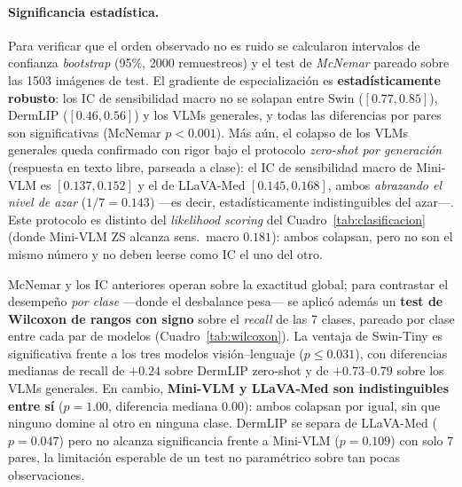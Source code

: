 \documentclass[11pt, a4paper]{article}
\begin{document}
\paragraph{Significancia estadística.} Para verificar que el orden observado no es ruido se calcularon
intervalos de confianza \emph{bootstrap} (95\%, 2000 remuestreos) y el test de \emph{McNemar} pareado
sobre las 1503 imágenes de test. El gradiente de especialización es \textbf{estadísticamente robusto}:
los IC de sensibilidad macro no se solapan entre Swin ($[0.77,0.85]$), DermLIP ($[0.46,0.56]$) y los VLMs
generales, y todas las diferencias por pares son significativas (McNemar $p<0.001$). Más aún, el colapso
de los VLMs generales queda confirmado con rigor bajo el protocolo \emph{zero-shot por generación}
(respuesta en texto libre, parseada a clase): el IC de sensibilidad macro de Mini-VLM es
$[0.137,0.152]$ y el de LLaVA-Med $[0.145,0.168]$, ambos \emph{abrazando el nivel de azar}
($1/7=0.143$) —es decir, estadísticamente indistinguibles del azar—. Este protocolo es distinto del
\emph{likelihood scoring} del Cuadro~\ref{tab:clasificacion} (donde Mini-VLM ZS alcanza sens.\ macro
$0.181$): ambos colapsan, pero no son el mismo número y no deben leerse como IC el uno del otro.

McNemar y los IC anteriores operan sobre la exactitud global; para contrastar el desempeño
\emph{por clase} —donde el desbalance pesa— se aplicó además un \textbf{test de Wilcoxon de rangos con
signo} sobre el \emph{recall} de las 7 clases, pareado por clase entre cada par de modelos
(Cuadro~\ref{tab:wilcoxon}). La ventaja de Swin-Tiny es significativa frente a los tres modelos
visión--lenguaje ($p \le 0.031$), con diferencias medianas de recall de $+0.24$ sobre DermLIP zero-shot y
de $+0.73$--$0.79$ sobre los VLMs generales. En cambio, \textbf{Mini-VLM y LLaVA-Med son indistinguibles
entre sí} ($p=1.00$, diferencia mediana $0.00$): ambos colapsan por igual, sin que ninguno domine al otro
en ninguna clase. DermLIP se separa de LLaVA-Med ($p=0.047$) pero no alcanza significancia frente a
Mini-VLM ($p=0.109$) con solo 7 pares, la limitación esperable de un test no paramétrico sobre tan pocas
observaciones.
\end{document}
